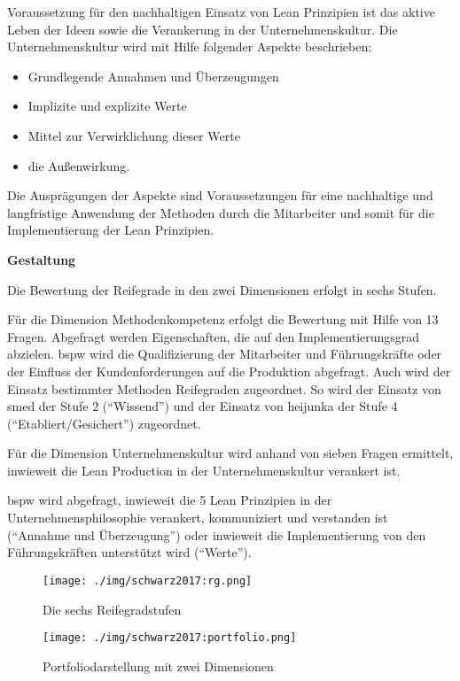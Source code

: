 Voraussetzung für den nachhaltigen Einsatz von Lean Prinzipien ist das aktive Leben der Ideen sowie die Verankerung in der Unternehmenskultur. %
Die Unternehmenskultur wird mit Hilfe folgender Aspekte beschrieben: 
\begin{itemize}
 \item Grundlegende Annahmen und Überzeugungen
\item Implizite und explizite Werte 
\item Mittel zur Verwirklichung dieser Werte
\item die Außenwirkung.
\end{itemize}
Die Ausprägungen der Aspekte sind Voraussetzungen für eine nachhaltige und langfristige Anwendung der Methoden durch die Mitarbeiter und somit für die Implementierung der Lean Prinzipien. 

\textbf{Gestaltung}

Die Bewertung der Reifegrade in den zwei Dimensionen erfolgt in sechs Stufen. %


Für die Dimension Methodenkompetenz erfolgt die Bewertung mit Hilfe von 13 Fragen. Abgefragt werden Eigenschaften, die auf den Implementierungsgrad abzielen. \Gls{bspw} wird die Qualifizierung der Mitarbeiter und Führungskräfte oder der Einfluss der Kundenforderungen auf die Produktion abgefragt. 
Auch wird der Einsatz bestimmter Methoden Reifegraden zugeordnet. So wird der Einsatz von \gls{smed} der Stufe 2 (``Wissend'') und der Einsatz von \gls{heijunka} der Stufe 4 (``Etabliert/Gesichert'') zugeordnet. 

Für die Dimension Unternehmenskultur wird anhand von sieben Fragen ermittelt, inwieweit die Lean Production in der Unternehmenskultur verankert ist. 

\Gls{bspw} wird abgefragt, inwieweit die 5 Lean Prinzipien in der Unternehmensphilosophie verankert, kommuniziert und verstanden ist (``Annahme und Überzeugung'') oder inwieweit die Implementierung von den Führungskräften unterstützt wird (``Werte''). 

\begin{figure}[!ht] 
    \begin{minipage}{0.3\linewidth} 
    \begin{center}
      \texttt{[image: ./img/schwarz2017:rg.png]}
    \end{center}
      \caption{Die sechs Reifegradstufen \cite{Schwarz2017}}\label{fig:links} 
    \end{minipage} 
    \hfill 
    \begin{minipage}{0.6\linewidth} 
 \texttt{[image: ./img/schwarz2017:portfolio.png]}
    \caption{Portfoliodarstellung mit zwei Dimensionen \cite{Schwarz2017}}\label{fig:rechts} 
    \end{minipage} 
  \end{figure} 

